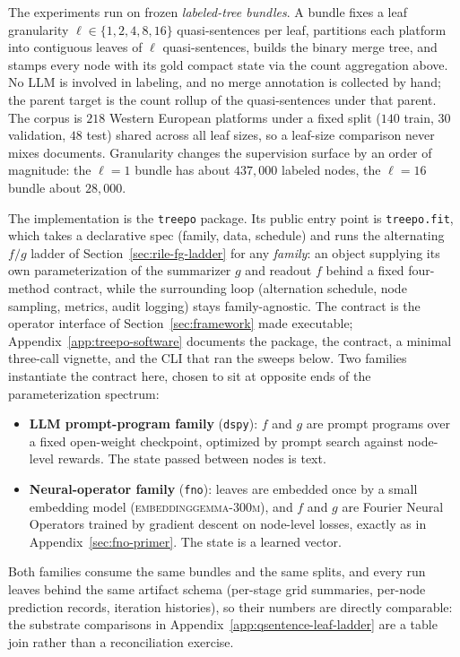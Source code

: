 The experiments run on frozen \emph{labeled-tree bundles}. A bundle
fixes a leaf granularity $\ell \in \{1, 2, 4, 8, 16\}$ quasi-sentences
per leaf, partitions each platform into contiguous leaves of $\ell$
quasi-sentences, builds the binary merge tree, and stamps every node
with its gold compact state via the count aggregation above. No LLM is
involved in labeling, and no merge annotation is collected by hand; the
parent target is the count rollup of the quasi-sentences under that
parent. The corpus is $218$ Western European platforms
under a fixed split ($140$ train, $30$ validation, $48$ test) shared
across all leaf sizes, so a leaf-size comparison never mixes documents.
Granularity changes the supervision surface by an order of magnitude:
the $\ell = 1$ bundle has about $437{,}000$ labeled nodes, the
$\ell = 16$ bundle about $28{,}000$.

The implementation is the \texttt{treepo} package. Its public entry
point is \texttt{treepo.fit}, which takes a declarative spec (family,
data, schedule) and runs the alternating $f/g$ ladder of
Section~\ref{sec:rile-fg-ladder} for any \emph{family}: an object
supplying its own parameterization of the summarizer $g$ and readout
$f$ behind a fixed four-method contract, while the surrounding loop
(alternation schedule, node sampling, metrics, audit logging) stays
family-agnostic. The contract is the operator interface of
Section~\ref{sec:framework} made executable;
Appendix~\ref{app:treepo-software} documents the package, the contract,
a minimal three-call vignette, and the CLI that ran the sweeps below.
Two families instantiate the contract here, chosen
to sit at opposite ends of the parameterization spectrum:
\begin{itemize}[leftmargin=1.5em]
    \item \textbf{LLM prompt-program family} (\texttt{dspy}): $f$ and
          $g$ are prompt programs over a fixed open-weight checkpoint,
          optimized by prompt search against node-level rewards. The
          state passed between nodes is text.
    \item \textbf{Neural-operator family} (\texttt{fno}): leaves are
          embedded once by a small embedding model
          (\textsc{embeddinggemma-300m}), and $f$ and $g$ are Fourier
          Neural Operators trained by gradient descent on node-level
          losses, exactly as in Appendix~\ref{sec:fno-primer}. The state
          is a learned vector.
\end{itemize}
Both families consume the same bundles and the same splits, and every
run leaves behind the same artifact schema (per-stage grid summaries,
per-node prediction records, iteration histories), so their numbers
are directly comparable: the substrate comparisons in
Appendix~\ref{app:qsentence-leaf-ladder} are a table join rather than
a reconciliation exercise.

